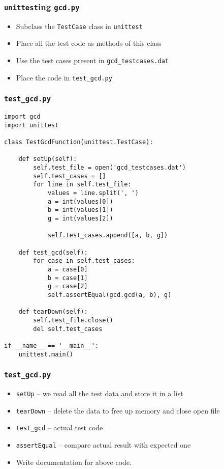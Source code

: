 \documentclass[12pt,presentation]{beamer}
\begin{document}
\begin{frame}[fragile]
  \frametitle{\texttt{unittest}ing \texttt{gcd.py}}
  \begin{itemize}
  \item Subclass the \texttt{TestCase} class in \texttt{unittest}
  \item Place all the test code as methods of this class
  \item Use the test cases present in \texttt{gcd\_testcases.dat}
  \item Place the code in \texttt{test\_gcd.py} 
  \end{itemize}
\end{frame}

\begin{frame}
  \frametitle{\texttt{test\_gcd.py}}
\small
\begin{lstlisting}
import gcd
import unittest

class TestGcdFunction(unittest.TestCase):

    def setUp(self):
        self.test_file = open('gcd_testcases.dat')
        self.test_cases = []
        for line in self.test_file:
            values = line.split(', ')
            a = int(values[0])
            b = int(values[1])
            g = int(values[2])

            self.test_cases.append([a, b, g])

    def test_gcd(self):
        for case in self.test_cases:
            a = case[0]
            b = case[1]
            g = case[2]
            self.assertEqual(gcd.gcd(a, b), g)

    def tearDown(self):
        self.test_file.close()
        del self.test_cases

if __name__ == '__main__':
    unittest.main()
\end{lstlisting}
\end{frame}

\begin{frame}[fragile]
  \frametitle{\texttt{test\_gcd.py}}
  \begin{itemize}
  \item \texttt{setUp} -- we read all the test data and store it in a
    list
  \item \texttt{tearDown} -- delete the data to free up memory and
    close open file
  \item \texttt{test\_gcd} -- actual test code
  \item \texttt{assertEqual} -- compare actual result with expected one
  \item Write documentation for above code. 
  \end{itemize}
\end{frame}
\end{document}
